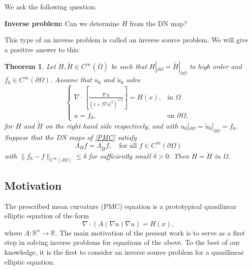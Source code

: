 \documentclass[a4paper, 10pt, twoside, notitlepage]{amsart}
\theoremstyle{plain}
\newtheorem{thm}{Theorem}[section]
\newcommand{\Om}{\Omega}
\numberwithin{equation}{section}
\newcommand {\R} {\mathbb{R}} \newcommand {\Z} {\mathbb{Z}}
\newcommand {\p} {\partial}
\newcommand{\ol}[1]{\overline{#1}}
\newcommand{\norm}[1]{\lVert #1 \rVert}
\newcommand{\abs}[1]{\lvert #1 \rvert}
\begin{document}

We ask the following question:
\begin{center}
	\textbf{Inverse problem:} Can we determine $H$ from the DN map?
\end{center}
This type of an inverse problem is called an inverse source problem. We will give a positive answer to this:

\begin{thm}\label{main_thm}
	Let $H,\tilde H\in C^{\infty}(\ol{\Om})$ be such that $H|_{\p\Om}=\tilde H|_{\p\Om}$ to high order and $f_0\in C^{\infty}(\p\Om)$. Assume that $u_0$ and $\tilde u_0$ solve 
    \begin{equation}\label{main_pde}
 	\left\{\begin{array}{ll}
 		\nabla\cdot\left[\frac{\nabla u}{(1+\abs{\nabla u}^2)^{1/2}}\right]=H(x), & \text{in}\,\, \Om \\
 		u=f_0, & \text{on}\,\, \partial\Om,
 	\end{array} \right.
    \end{equation}
     for $H$ and $\tilde H$ on the right hand side respectively, and with $u_0|_{\p\Om}=\tilde u_0|_{\p\Om}= f_0$. Suppose that the DN maps of \eqref{PMC} satisfy 
	\begin{equation*}
		\Lambda_{H}f=\Lambda_{\tilde H}f,\quad\text{for all } f\in C^{\infty}(\p\Om)
	\end{equation*}
	with $\norm{f_0 - f}_{C^{\infty}(\p\Om)}\leq\delta$ for sufficiently small $\delta>0$. Then $H=\tilde H$ in $\Om$.
\end{thm}


\subsection{Motivation}
The prescribed mean curvature (PMC) equation is a prototypical quasilinear elliptic equation of the form
\begin{equation}\label{eq:PMC}
	\nabla \cdot \left( A(\nabla u) \nabla u \right) = H(x),
\end{equation}
where \( A : \R^n \to \R \). The main motivation of the present work is to serve as a first step in solving inverse problems for equations of the above. To the best of our knowledge, it is the first to consider an inverse source problem for a quasilinear elliptic equation.
\end{document}
